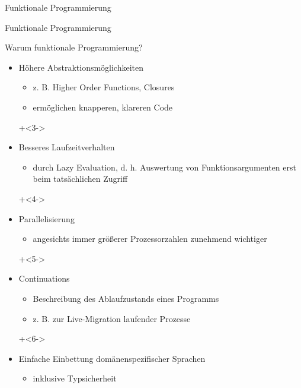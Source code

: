 \begin{frame}[fragile]{Funktionale Programmierung}
\begin{center}
\Huge
Funktionale Programmierung
\end{center}
\end{frame}

\begin{frame}[fragile]{Warum funktionale Programmierung?}
\begin{itemize}
\onslide+<2->
\item Höhere Abstraktionsmöglichkeiten
\begin{itemize}
\item z. B. Higher Order Functions, Closures
\item ermöglichen knapperen, klareren Code
\end{itemize}

\onslide+<3->
\item Besseres Laufzeitverhalten
\begin{itemize}
\item durch Lazy Evaluation, d. h. Auswertung von Funktionsargumenten erst beim tatsächlichen Zugriff
\end{itemize}

\onslide+<4->
\item Parallelisierung
\begin{itemize}
\item angesichts immer größerer Prozessorzahlen zunehmend wichtiger
\end{itemize}

\onslide+<5->
\item Continuations
\begin{itemize}
\item Beschreibung des Ablaufzustands eines Programms 
\item z. B. zur Live-Migration laufender Prozesse
\end{itemize}

\onslide+<6->
\item Einfache Einbettung domänenspezifischer Sprachen
\begin{itemize}
\item inklusive Typsicherheit
\end{itemize}

\end{itemize}
\end{frame}


